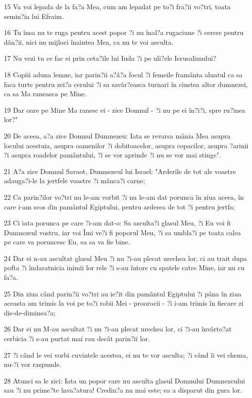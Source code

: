 \par 15 Va voi lepada de la fa?a Mea, cum am lepadat pe to?i fra?ii vo?tri, toata semin?ia lui Efraim.
\par 16 Tu însa nu te ruga pentru acest popor ?i nu înal?a rugaciune ?i cerere pentru dân?ii, nici nu mijloci înaintea Mea, ca nu te voi asculta.
\par 17 Nu vezi tu ce fac ei prin ceta?ile lui Iuda ?i pe uli?ele Ierusalimului?
\par 18 Copiii aduna lemne, iar parin?ii a?â?a focul ?i femeile framânta aluatul ca sa faca turte pentru zei?a cerului ?i sa savâr?easca turnari în cinstea altor dumnezei, ca sa Ma raneasca pe Mine.
\par 19 Dar oare pe Mine Ma ranesc ei - zice Domnul - ?i nu pe ei în?i?i, spre ru?inea lor?"
\par 20 De aceea, a?a zice Domnul Dumnezeu: Iata se revarsa mânia Mea asupra locului acestuia, asupra oamenilor ?i dobitoacelor, asupra copacilor, asupra ?arinii ?i asupra roadelor pamântului, ?i se vor aprinde ?i nu se vor mai stinge".
\par 21 A?a zice Domnul Savaot, Dumnezeul lui Israel: "Arderile de tot ale voastre adauga?i-le la jertfele voastre ?i mânca?i carne;
\par 22 Ca parin?ilor vo?tri nu le-am vorbit ?i nu le-am dat porunca în ziua aceea, în care i-am scos din pamântul Egiptului, pentru arderea de tot ?i pentru jertfa;
\par 23 Ci iata porunca pe care ?i-am dat-o: Sa asculta?i glasul Meu, ?i Eu voi fi Dumnezeul vostru, iar voi Îmi ve?i fi poporul Meu, ?i sa umbla?i pe toata calea pe care va poruncesc Eu, ea sa va fie bine.
\par 24 Dar ei n-au ascultat glasul Meu ?i nu ?i-au plecat urechea lor, ci au trait dupa pofta ?i îndaratnicia inimii lor rele ?i s-au întors cu spatele catre Mine, iar nu cu fa?a.
\par 25 Din ziua când parin?ii vo?tri au ie?it din pamântul Egiptului ?i pâna în ziua aceasta am trimis la voi pe to?i robii Mei - proorocii - ?i i-am trimis în fiecare zi dis-de-diminea?a;
\par 26 Dar ei nu M-au ascultat ?i nu ?i-au plecat urechea lor, ci ?i-au învârto?at cerbicia ?i s-au purtat mai rau decât parin?ii lor.
\par 27 ?i când le vei vorbi cuvintele acestea, ei nu te vor asculta; ?i când îi vei chema, nu-?i vor raspunde.
\par 28 Atunci sa le zici: Iata un popor care nu asculta glasul Domnului Dumnezeului sau ?i nu prime?te înva?atura! Credin?a nu mai este; ea a disparut din gura lor.
